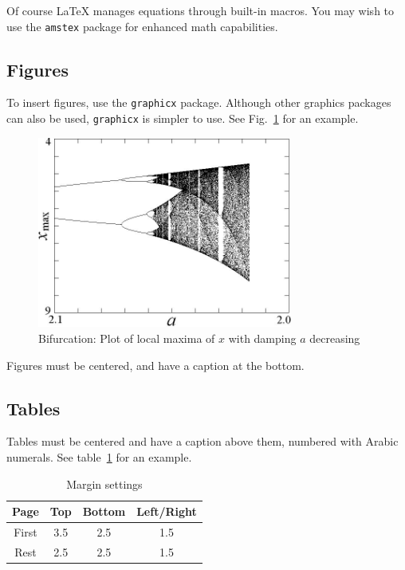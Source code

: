 \documentclass{ifacconf}
\begin{document}
Of course LaTeX manages equations through built-in macros. You may
wish to use the \texttt{amstex} package for enhanced math
capabilities.

\subsection{Figures}

To insert figures, use the \texttt{graphicx} package. Although other
graphics packages can also be used, \texttt{graphicx} is simpler to
use. See  Fig.~\ref{fig:bifurcation} for an example.

\begin{figure}
\begin{center}
\includegraphics[width=8.4cm]{bifurcation}    %
\caption{Bifurcation: Plot of local maxima of $x$ with damping $a$ decreasing} 
\label{fig:bifurcation}
\end{center}
\end{figure}

Figures must be centered, and have a caption at the bottom. 

\subsection{Tables}
Tables must be centered and have a caption above them, numbered with
Arabic numerals. See table~\ref{tb:margins} for an example.

\begin{table}[hb]
\begin{center}
\caption{Margin settings}\label{tb:margins}
\begin{tabular}{cccc}
Page & Top & Bottom & Left/Right \\\hline
First & 3.5 & 2.5 & 1.5 \\
Rest & 2.5 & 2.5 & 1.5 \\ \hline
\end{tabular}
\end{center}
\end{table}
\end{document}
